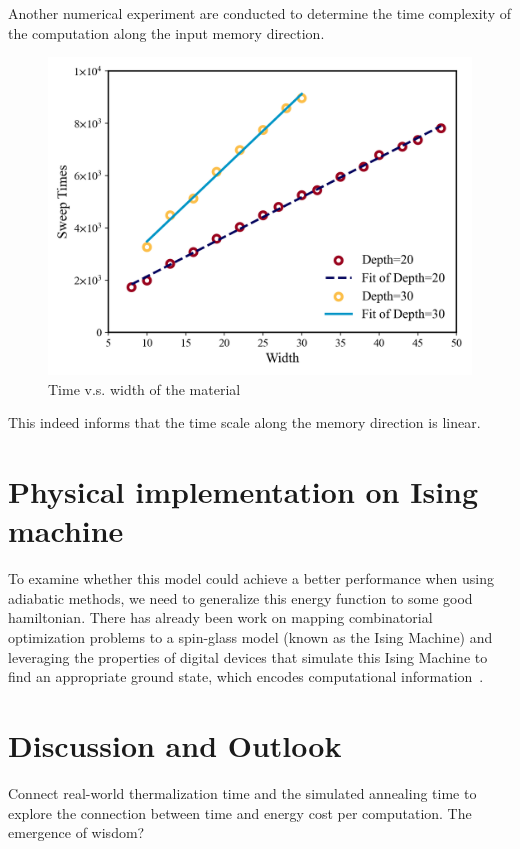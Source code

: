 \documentclass[twocolumn,superscriptaddress,english,showpacs,longbibliography]{revtex4-2}
\begin{document}
Another numerical experiment are conducted to determine the time complexity of the computation along the input memory direction. 

\begin{figure}[H]
    \centering
    \includegraphics[width=\columnwidth,keepaspectratio]{../notes/images/toymodel_time_vs_width.png}
    \caption{Time v.s. width of the material}
\end{figure}

This indeed informs that the time scale along the memory direction is linear.

\section{Physical implementation on Ising machine}\label{spin-glass}

To examine whether this model could achieve a better performance when
using adiabatic methods, we need to generalize this energy function to
some good hamiltonian. There has already been work on mapping
combinatorial optimization problems to a spin-glass model (known as the
Ising Machine) and leveraging the properties of digital devices that
simulate this Ising Machine to find an appropriate ground state, which
encodes computational information~\cite{Aadit2022,Bybee2023}.



\section{Discussion and Outlook}
Connect real-world thermalization time and the simulated annealing time to explore the connection between time and energy cost per computation.
The emergence of wisdom?
\end{document}
